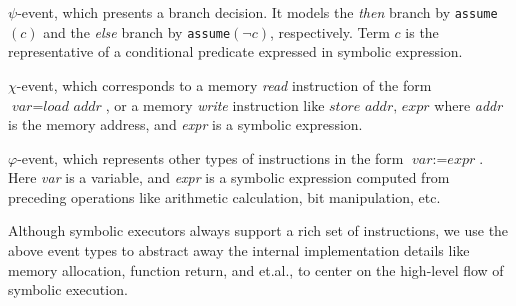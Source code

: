 \documentclass[sigconf]{acmart}
\newcommand{\textcode}[1]{\texttt{#1}}
\begin{document}
\begin{itemize*}
  \item $\psi$-event, which presents a branch decision. It models the 
    \textit{then} branch by \textcode{assume$(c)$} and the \textit{else} 
    branch by \textcode{assume$(\neg c)$}, respectively. Term $\textit{c}$ 
    is the representative of a conditional predicate expressed in symbolic 
    expression. 

  \item $\chi$-event, which corresponds to a memory \textit{read} instruction 
    of the form $\textit{var}=\textit{load~addr}$, or a memory \textit{write} 
    instruction like $\textit{store~addr, expr}$ where \textit{addr} is the 
    memory address, and \textit{expr} is a symbolic expression.

  \item $\varphi$-event, which represents other types of instructions in the 
    form $\textit{var}:=\textit{expr}$. Here \textit{var} is a variable, and 
    \textit{expr} is a symbolic expression computed from preceding operations 
    like arithmetic calculation, bit manipulation, etc.
\end{itemize*}


Although symbolic executors always support a rich set of instructions, we use 
the above event types to abstract away the internal implementation details like 
memory allocation, function return, and et.al., to center on the high-level 
flow of symbolic execution.
\end{document}

